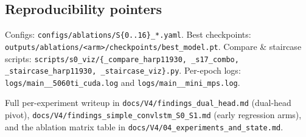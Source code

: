 \subsection*{Reproducibility pointers}
Configs: \texttt{configs/ablations/S\{0..16\}\_*.yaml}.
Best checkpoints: \texttt{outputs/ablations/<arm>/checkpoints/best\_model.pt}.
Compare \& staircase scripts:
\texttt{scripts/s0\_viz/\{\_compare\_harp11930, \_s17\_combo,
\_staircase\_harp11930, \_staircase\_viz\}.py}. Per-epoch logs:
\texttt{logs/main\_\_5060ti\_cuda.log} and
\texttt{logs/main\_\_mini\_mps.log}.

Full per-experiment writeup
in \texttt{docs/V4/findings\_dual\_head.md} (dual-head pivot),
\texttt{docs/V4/findings\_simple\_convlstm\_S0\_S1.md} (early regression
arms), and the ablation matrix table in
\texttt{docs/V4/04\_experiments\_and\_state.md}.

